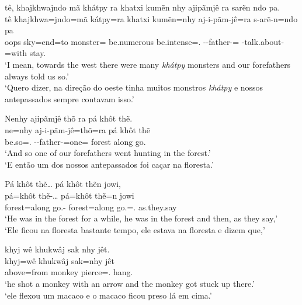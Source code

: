\documentclass[output=paper,
modfonts,nonflat
]{langsci/langscibook}
\begin{document}
\newpage 
\ea  tê, khajkhwajndo mã khátpy ra khatxi kumẽn nhy ajipãmjê ra sarẽn ndo pa. \\[.3em]
\gll tê   khajkhwa=jndo=mã kátpy=ra       khatxi      kumẽn=nhy             aj-i-pãm-jê=ra                 s-arẽ-n=ndo                    pa         \\
     oops sky=end=to       monster=\Nom{} be.numerous be.intense=\AAnd.\Ds{} \Pl-\First-father-\Pl{}=\Nom{} \Third-talk.about-\Nmlz{}=with stay.\Pl{} \\
\glt `I mean, towards the west there were many \textit{khátpy} monsters and our forefathers always told us so.' \\
     `Quero dizer, na direção do oeste tinha muitos monstros \textit{khátpy} e nossos antepassados sempre contavam isso.' \\
\z

\ea  Nenhy ajipãmjê thõ ra pá khôt thẽ. \\[.3em]
\gll ne=nhy           aj-i-pãm-jê=thõ=ra                 pá     khôt  thẽ      \\
     be.so=\AAnd.\Ds{} \Pl-\First-father-\Pl{}=one=\Nom{} forest along go.\Sg{} \\
\glt `And so one of our forefathers went hunting in the forest.' \\
     `E então um dos nossos antepassados foi caçar na floresta.' \\
\label{exe:nomdet}
\z

\ea  Pá khôt thẽ\ldots{} pá khôt thẽn jowi, \\[.3em]
\gll pá=khôt      thẽ-\ldots{}\footnotemark{} pá=khôt      thẽ=n             jowi        \\
     forest=along go.\Sg{}-\Ints{}            forest=along go.\Sg=\AAnd.\Ss{} as.they.say \\
\glt `He was in the forest for a while, he was in the forest and then, as they say,' \\
     `Ele ficou na floresta bastante tempo, ele estava na floresta e dizem que,' \\
\z

\ea  khyj wê khukwâj sak nhy jêt. \\[.3em]
\gll khyj=wê    khukwâj sak=nhy           jêt        \\
     above=from monkey  pierce=\AAnd.\Ds{} hang.\Sg{} \\
\glt `he shot a monkey with an arrow and the monkey got stuck up there.' \\
     `ele flexou um macaco e o macaco ficou preso lá em cima.' \\
\label{exe:adjppdirobjver}
\z
\end{document}
